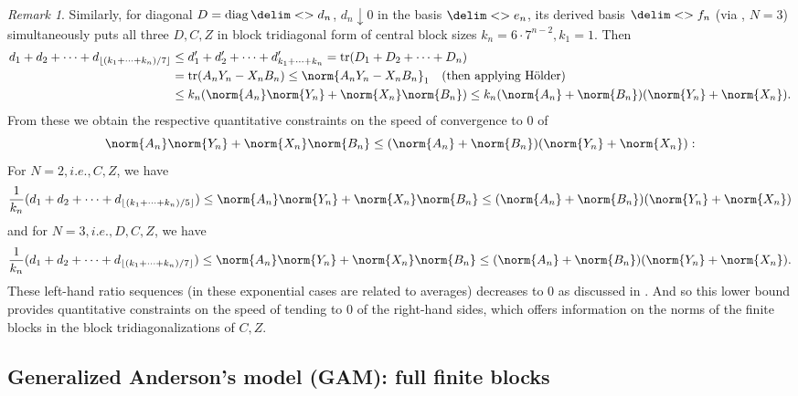 \documentclass[10pt,reqno]{amsart}
\theoremstyle{remark}
\newtheorem{remark}[theorem]{Remark}
\DeclareMathOperator{\diag}{diag}
\DeclareMathOperator{\trace}{tr}
\newcommand{\seq}{\delim<>}
\numberwithin{equation}{section}
\begin{document}
\begin{remark}
  Similarly, for diagonal $D = \diag \seq{d_n}$, $d_n \downarrow 0$ in the basis $\seq{e_n}$, its derived basis $\seq{f_n}$ (via , $N=3$) simultaneously puts all three $D,C,Z$ in block tridiagonal form of central block sizes $k_n = 6\cdot 7^{n-2}, k_1=1$.
  Then
  \begin{align*}
    d_1 + d_2 + \cdots + d_{\lfloor ({k_1 + \cdots + k_n})/{7}\rfloor} &\le d_1' + d_2' + \cdots + d_{k_1 + \cdots + k_n}' = \trace(D_1+D_2+\dots+D_n)\\
                                                                       &=\trace(A_nY_n - X_nB_n) \le \norm{A_nY_n - X_nB_n}_1 \quad \text{(then applying H\"{o}lder)} \\
                                                                       &\le k_n(\norm{A_n}\norm{Y_n} + \norm{X_n}\norm{B_n}) \le k_n(\norm{A_n}+\norm{B_n})(\norm{Y_n} + \norm{X_n}).
  \end{align*}
  From these we obtain the respective quantitative constraints on the speed of convergence to $0$ of
  \begin{equation*}
    \norm{A_n}\norm{Y_n} + \norm{X_n}\norm{B_n} \le (\norm{A_n}+\norm{B_n})(\norm{Y_n} + \norm{X_n}):
  \end{equation*}
  For $N=2, i.e., C,Z$, we have
  \begin{equation}
    \label{eq4.7ageneral}
    \frac{1}{k_n} (d_1 + d_2 + \cdots + d_{\lfloor ({k_1 + \cdots + k_n})/{5}\rfloor}) \le \norm{A_n}\norm{Y_n} + \norm{X_n}\norm{B_n} \le (\norm{A_n}+\norm{B_n})(\norm{Y_n} + \norm{X_n})
  \end{equation}
  and for $N=3, i.e., D,C,Z$, we have
  \begin{equation}
    \label{eq4.7bgeneral}
    \frac{1}{k_n} (d_1 + d_2 + \cdots + d_{\lfloor ({k_1 + \cdots + k_n})/{7}\rfloor}) \le \norm{A_n}\norm{Y_n} + \norm{X_n}\norm{B_n} \le (\norm{A_n}+\norm{B_n})(\norm{Y_n} + \norm{X_n}).
  \end{equation}
  These left-hand ratio sequences (in these exponential cases are related to averages) decreases to $0$ as discussed in .
  And so this lower bound provides quantitative constraints on the speed of tending to $0$ of the right-hand sides, which offers information on the norms of the finite blocks in the block tridiagonalizations of $C,Z$.
\end{remark}

\subsection*{Generalized Anderson's model (GAM): full finite blocks}
\end{document}
